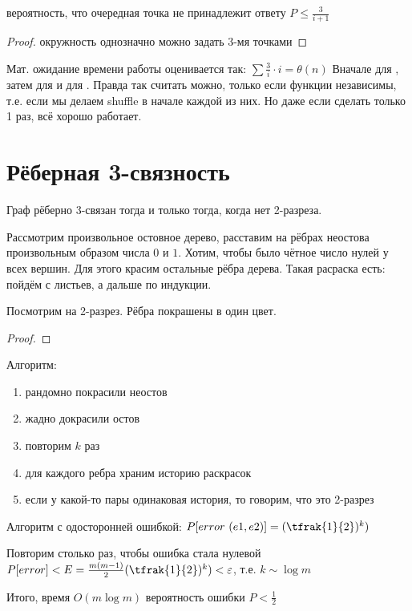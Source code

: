 \begin{lemma}
вероятность, что очередная точка не принадлежит ответу $P \leq \frac{3}{i+1}$
\end{lemma}

\begin{proof}
окружность однозначно можно задать 3-мя точками
\end{proof}

Мат. ожидание времени работы оценивается так: $\sum \frac{3}{i} \cdot i = \theta(n)$
Вначале для , затем для  и для .
Правда так считать можно, только если функции независимы, т.е. если
мы делаем shuffle в начале каждой из них. Но даже если сделать только 1 раз,
всё хорошо работает.

\section{Рёберная 3-связность}

Граф рёберно 3-связан тогда и только тогда, когда нет 2-разреза.

Рассмотрим произвольное остовное дерево, расставим на рёбрах
неостова произвольным образом числа $0$ и $1$. Хотим, чтобы было
чётное число нулей у всех вершин. Для этого красим остальные
рёбра дерева. Такая расраска есть: пойдём с листьев, а дальше по индукции.

\begin{assert}
    Посмотрим на 2-разрез. Рёбра покрашены в один цвет.
\end{assert}

\begin{proof}
    \TODO
\end{proof}

Алгоритм:
\begin{enumerate}
    \item рандомно покрасили неостов
    \item жадно докрасили остов
    \item повторим $k$ раз
    \item для каждого ребра храним историю раскрасок
    \item если у какой-то пары одинаковая история, то говорим, что это 2-разрез
\end{enumerate}

Алгоритм с одосторонней ошибкой: $P[error \ (e1, e2)] = (\tfrak{1}{2})^k)$

Повторим столько раз, чтобы ошибка стала нулевой 
$P[error] < E = \frac{m(m-1)}{2} (\tfrak{1}{2})^k) < \varepsilon$,
т.е. $k \sim \log m$

Итого, время $O(m \log m)$ вероятность ошибки $P < \frac{1}{2}$

